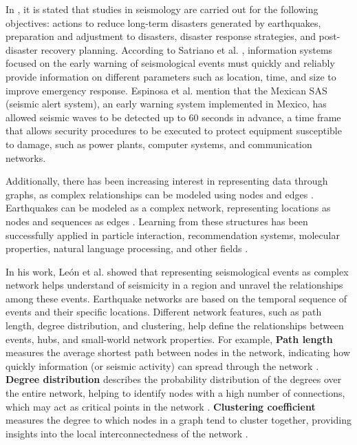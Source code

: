 \documentclass[sn-mathphys-num]{sn-jnl}
\begin{document}
In \cite{jiao_artificial_2020}, it is stated that studies in seismology are carried out for the following objectives: actions to reduce long-term disasters generated by earthquakes, preparation and adjustment to disasters, disaster response strategies, and post-disaster recovery planning. According to Satriano et al. \cite{satriano_earthquake_2011}, information systems focused on the early warning of seismological events must quickly and reliably provide information on different parameters such as location, time, and size to improve emergency response. Espinosa et al. \cite{espinosa-aranda_evolution_2009} mention that the Mexican SAS (seismic alert system), an early warning system implemented in Mexico, has allowed seismic waves to be detected up to 60 seconds in advance, a time frame that allows security procedures to be executed to protect equipment susceptible to damage, such as power plants, computer systems, and communication networks.

Additionally, there has been increasing interest in representing data through graphs, as complex relationships can be modeled using nodes and edges \cite{chami_machine_2021}. Earthquakes can be modeled as a complex network, representing locations as nodes and sequences as edges \cite{leon_modeling_2018}. Learning from these structures has been successfully applied in particle interaction, recommendation systems, molecular properties, natural language processing, and other fields \cite{grattarola_graph_2020}.

In his work, León et al. \cite{leon_modeling_2018} showed that representing seismological events as complex network helps understand of seismicity in a region and unravel the relationships among these events. Earthquake networks are based on the temporal sequence of events and their specific locations. Different network features, such as path length, degree distribution, and clustering, help define the relationships between events, hubs, and small-world network properties. For example, \textbf{Path length} measures the average shortest path between nodes in the network, indicating how quickly information (or seismic activity) can spread through the network \cite{newman_2010}. \textbf{Degree distribution} describes the probability distribution of the degrees over the entire network, helping to identify nodes with a high number of connections, which may act as critical points in the network \cite{barabsi_2009}. \textbf{Clustering coefficient} measures the degree to which nodes in a graph tend to cluster together, providing insights into the local interconnectedness of the network \cite{watts_1998}. 
\end{document}
